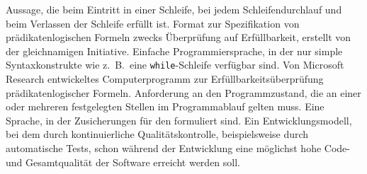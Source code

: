 \begin{description}
     Aussage, die beim Eintritt in einer Schleife, bei jedem Schleifendurchlauf und beim Verlassen der Schleife erfüllt ist.
     Format zur Spezifikation von prädikatenlogischen Formeln zwecks Überprüfung auf Erfüllbarkeit, erstellt von der gleichnamigen Initiative.
     Einfache Programmiersprache, in der nur simple Syntaxkonstrukte wie z.~B.\ eine \texttt{while}-Schleife verfügbar sind.
     Von Microsoft Research entwickeltes Computerprogramm zur Erfüllbarkeitsüberprüfung prädikatenlogischer Formeln.
     Anforderung an den Programmzustand, die an einer oder mehreren festgelegten Stellen im Programmablauf gelten muss.
     Eine Sprache, in der Zusicherungen für den  formuliert sind.
     Ein Entwicklungsmodell, bei dem durch kontinuierliche Qualitätskontrolle, beispielsweise durch automatische Tests, schon während der Entwicklung eine möglichst hohe Code- und Gesamtqualität der Software erreicht werden soll.
\end{description}


